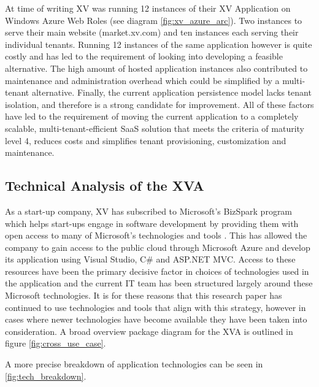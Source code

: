 At time of writing XV was running 12 instances of their XV Application on Windows Azure Web Roles (see diagram \ref{fig:xv_azure_arc}). Two instances to serve their main website (market.xv.com) and ten instances each serving their individual tenants. Running 12 instances of the same application however is quite costly and has led to the requirement of looking into developing a feasible alternative. The high amount of hosted application instances also contributed to maintenance and administration overhead which could be simplified by a multi-tenant alternative. Finally, the current application persistence model lacks tenant isolation, and therefore is a strong candidate for improvement. All of these factors have led to the requirement of moving the current application to a completely scalable, multi-tenant-efficient SaaS solution that meets the criteria of maturity level 4, reduces costs and simplifies tenant provisioning, customization and maintenance.



\subsection{Technical Analysis of the XVA}
\label{sec:techconst}
As a start-up company, XV has subscribed to Microsoft's BizSpark program which helps start-ups engage in software development by providing them with open access to many of Microsoft's technologies and tools \cite{BizSpark}. This has allowed the company to gain access to the public cloud through Microsoft Azure and develop its application using Visual Studio, C\# and ASP.NET MVC. Access to these resources have been the primary decisive factor in choices of technologies used in the application and the current IT team has been structured largely around these Microsoft technologies. It is for these reasons that this research paper has continued to use technologies and tools that align with this strategy, however in cases where newer technologies have become available they have been taken into consideration. A broad overview package diagram for the XVA is outlined in figure \ref{fig:cross_use_case}.
 
 
A more precise breakdown of application technologies can be seen in \ref{fig:tech_breakdown}.


